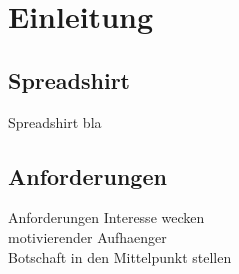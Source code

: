 \section{Einleitung}

\subsection{Spreadshirt}
\begin{frame}{Spreadshirt}
	bla
\end{frame}

\subsection{Anforderungen}
\begin{frame}{Anforderungen}
    Interesse wecken\\
    motivierender Aufhaenger\\
    Botschaft in den Mittelpunkt stellen
\end{frame}